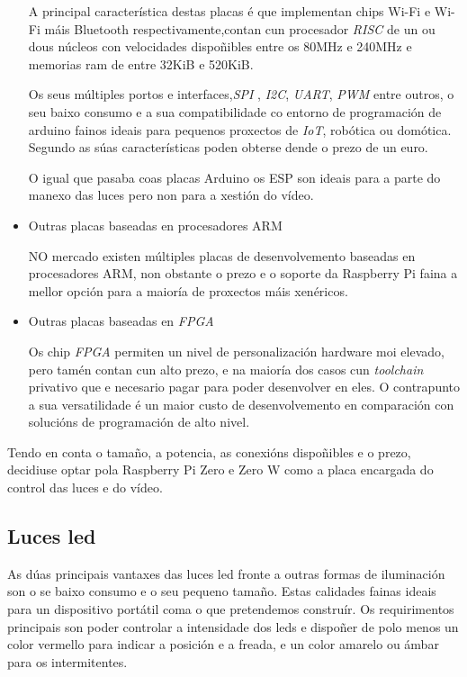 \begin{itemize}
A principal característica destas placas é que implementan chips Wi-Fi e Wi-Fi máis Bluetooth respectivamente,contan cun procesador \emph{RISC} de un ou dous núcleos con velocidades dispoñibles entre os 80MHz e 240MHz e memorias ram de entre 32KiB e 520KiB.

Os seus múltiples portos e interfaces,\emph{SPI} ,  \emph{I2C}, \emph{UART}, \emph{PWM} entre outros, o seu baixo consumo e a sua compatibilidade co entorno de programación de arduino fainos ideais para pequenos proxectos de \emph{IoT}, robótica ou domótica. Segundo as súas características poden obterse dende o prezo de un euro.

O igual que pasaba coas placas Arduino os ESP son ideais para a parte do manexo das luces pero non para a xestión do vídeo.
    \item Outras placas baseadas en procesadores ARM

NO mercado existen múltiples placas de desenvolvemento baseadas en procesadores ARM, non obstante o prezo e o soporte da Raspberry Pi faina a mellor opción para a maioría de proxectos máis xenéricos.
    \item Outras placas baseadas en \emph{FPGA}

Os chip \emph{FPGA} permiten un nivel de personalización hardware moi elevado, pero tamén contan cun alto prezo, e na maioría dos casos cun \emph{toolchain} privativo que e necesario pagar para poder desenvolver en eles. O contrapunto a sua versatilidade é un maior custo de desenvolvemento en comparación con solucións de programación de alto nivel.
\end{itemize}
Tendo en conta o tamaño, a potencia, as conexións dispoñibles e o prezo, decidiuse optar pola Raspberry Pi Zero e Zero W como a placa encargada do control das luces e do vídeo.

\subsection{Luces led}
As dúas principais vantaxes das luces led fronte a outras formas de iluminación son o se baixo consumo e o seu pequeno tamaño. Estas calidades fainas ideais para un dispositivo portátil coma o que pretendemos construír.
Os requirimentos principais son poder controlar a intensidade dos leds e dispoñer de polo menos un color vermello para indicar a posición e a freada, e un color amarelo ou ámbar para os intermitentes.

